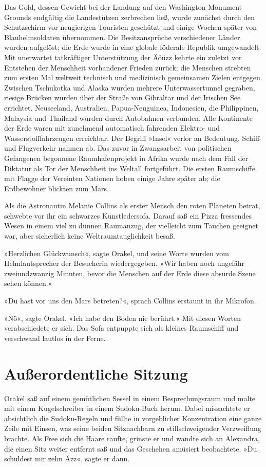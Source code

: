 Das Gold, dessen Gewicht bei der Landung auf den Washington Monument Grounds endgültig die Landestützen zerbrechen ließ, wurde zunächst durch den Schutzschirm vor neugierigen Touristen geschützt und einige Wochen später von Blauhelmsoldaten übernommen. Die Besitzansprüche verschiedener Länder wurden aufgelöst; die Erde wurde in eine globale föderale Republik umgewandelt. Mit unerwartet tatkräftiger Unterstützung der Äöüzz kehrte ein zuletzt vor Entstehen der Menschheit vorhandener Frieden zurück; die Menschen strebten zum ersten Mal weltweit technisch und medizinisch gemeinsamen Zielen entgegen. Zwischen Tschukotka und Alaska wurden mehrere Unterwassertunnel gegraben, riesige Brücken wurden über der Straße von Gibraltar und der Irischen See errichtet. Neuseeland, Australien, Papua-Neuguinea, Indonesien, die Philippinen, Malaysia und Thailand wurden durch Autobahnen verbunden. Alle Kontinente der Erde waren mit zunehmend automatisch fahrenden Elektro- und Wasserstofffahrzeugen erreichbar. Der Begriff »Insel« verlor an Bedeutung, Schiff- und Flugverkehr nahmen ab. Das zuvor in Zwangsarbeit von politischen Gefangenen begonnene Raumhafenprojekt in Afrika wurde nach dem Fall der Diktatur als Tor der Menschheit ins Weltall fortgeführt. Die ersten Raumschiffe mit Flagge der Vereinten Nationen hoben einige Jahre später ab; die Erdbewohner blickten zum Mars.

Als die Astronautin Melanie Collins als erster Mensch den roten Planeten betrat, schwebte vor ihr ein schwarzes Kunstledersofa. Darauf saß ein Pizza fressendes Wesen in einem viel zu dünnen Raumanzug, der vielleicht zum Tauchen geeignet war, aber sicherlich keine Weltraumtauglichkeit besaß.

»Herzlichen Glückwunsch«, sagte Orakel, und seine Worte wurden vom Helmlautsprecher der Besucherin wiedergegeben. »Wir haben noch ungefähr zweiundzwanzig Minuten, bevor die Menschen auf der Erde diese absurde Szene sehen können.«

»Du hast vor uns den Mars betreten?«, sprach Collins erstaunt in ihr Mikrofon.

»Nö«, sagte Orakel. »Ich habe den Boden nie berührt.« Mit diesen Worten verabschiedete er sich. Das Sofa entpuppte sich als kleines Raumschiff und verschwand lautlos in der Ferne.


\chapter{Außerordentliche Sitzung}

Orakel saß auf einem gemütlichen Sessel in einem Besprechungsraum und malte mit einem Kugelschreiber in einem Sudoku-Buch herum. Dabei missachtete er absichtlich die Sudoku-Regeln und füllte in vorgeblicher Konzentration eine ganze Zeile mit Einsen, was seine beiden Sitznachbarn zu stillschweigender Verzweiflung brachte. Als Free sich die Haare raufte, grinste er und wandte sich an Alexandra, die einen Sitz weiter entfernt saß und das Geschehen amüsiert beobachtete. »Du schuldest mir zehn Äzz«, sagte er dann.

